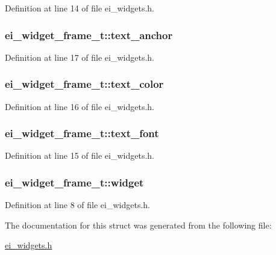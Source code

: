 Definition at line 14 of file ei\-\_\-widgets.\-h.

\hypertarget{structei__widget__frame__t_a3a69af5f59d337720b4f2b5af3d487bc}{
\subsubsection[{text\-\_\-anchor}]{ ei\-\_\-widget\-\_\-frame\-\_\-t\-::text\-\_\-anchor}}\label{structei__widget__frame__t_a3a69af5f59d337720b4f2b5af3d487bc}


Definition at line 17 of file ei\-\_\-widgets.\-h.

\hypertarget{structei__widget__frame__t_acc7c5954f1ff3e079d40a600755f67d6}{
\subsubsection[{text\-\_\-color}]{ ei\-\_\-widget\-\_\-frame\-\_\-t\-::text\-\_\-color}}\label{structei__widget__frame__t_acc7c5954f1ff3e079d40a600755f67d6}


Definition at line 16 of file ei\-\_\-widgets.\-h.

\hypertarget{structei__widget__frame__t_a6f9e54afa5805784c3feee588832e20d}{
\subsubsection[{text\-\_\-font}]{ ei\-\_\-widget\-\_\-frame\-\_\-t\-::text\-\_\-font}}\label{structei__widget__frame__t_a6f9e54afa5805784c3feee588832e20d}


Definition at line 15 of file ei\-\_\-widgets.\-h.

\hypertarget{structei__widget__frame__t_ad375e0d41821e8f1dcf5e061d140ac0d}{
\subsubsection[{widget}]{ ei\-\_\-widget\-\_\-frame\-\_\-t\-::widget}}\label{structei__widget__frame__t_ad375e0d41821e8f1dcf5e061d140ac0d}


Definition at line 8 of file ei\-\_\-widgets.\-h.



The documentation for this struct was generated from the following file\-:\begin{DoxyCompactItemize}
\item 
\hyperlink{ei__widgets_8h}{ei\-\_\-widgets.\-h}\end{DoxyCompactItemize}
